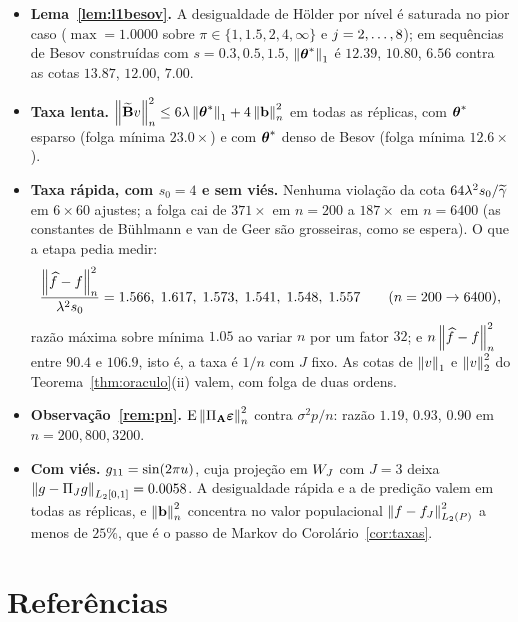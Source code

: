 \documentclass[11pt,a4paper]{article}
\newcommand{\Amat}{\mathbf{A}}
\newcommand{\Bmat}{\mathbf{B}}
\newcommand{\Btil}{\widetilde{\Bmat}}
\newcommand{\PA}{\Pi_{\Amat}}
\newcommand{\bveps}{\boldsymbol{\varepsilon}}
\newcommand{\bb}{\mathbf{b}}
\newcommand{\gtil}{\widetilde{\gamma}}
\begin{document}
\begin{itemize}[nosep, leftmargin=*]
    $0.95$: a cota sub-gaussiana é conservadora por um fator $2$
    ($\pen_{0}$ mediano $0.1437$ contra
    $\lVert\Btil\T\bveps/n\rVert_{\infty}$ mediano $0.0717$ em $n = 200$).
  \item \textbf{Lema~\ref{lem:l1besov}.} A desigualdade de Hölder por nível é
    saturada no pior caso ($\max = 1.0000$ sobre
    $\pi \in \{1, 1.5, 2, 4, \infty\}$ e $j = 2,\dots,8$); em sequências de
    Besov construídas com $s = 0.3, 0.5, 1.5$, $\left\lVert \boldsymbol{\theta}^{*} \right\rVert_{1}$ é
    $12.39$, $10.80$, $6.56$ contra as cotas $13.87$, $12.00$, $7.00$.
  \item \textbf{Taxa lenta.} $\normn{\Btil v}^{2} \le 6\pen\norm{\thetastar}_{1}
    + 4\normn{\bb}^{2}$ em todas as réplicas, com $\boldsymbol{\theta}^{*}$ esparso
    (folga mínima $23.0\times$) e com $\boldsymbol{\theta}^{*}$ denso de Besov
    (folga mínima $12.6\times$).
  \item \textbf{Taxa rápida, com $s_{0} = 4$ e sem viés.} Nenhuma violação da
    cota $64\pen^{2}s_{0}/\gtil$ em $6 \times 60$ ajustes; a folga cai de
    $371\times$ em $n = 200$ a $187\times$ em $n = 6400$ (as constantes de
    Bühlmann e van de Geer são grosseiras, como se espera). O que a etapa
    pedia medir:
    \[
      \frac{\left\lVert \widehat{f}-f \right\rVert_{n}^{2}}{\lambda^{2}s_{0}}
      = 1.566,\; 1.617,\; 1.573,\; 1.541,\; 1.548,\; 1.557
      \qquad (n = 200 \to 6400),
    \]
    razão máxima sobre mínima $1.05$ ao variar $n$ por um fator $32$; e
    $n\left\lVert \widehat{f}-f \right\rVert_{n}^{2}$ entre $90.4$ e $106.9$, isto é, a taxa é
    $1/n$ com $J$ fixo. As cotas de $\left\lVert v \right\rVert_{1}$ e $\left\lVert v \right\rVert_{2}^{2}$ do
    Teorema~\ref{thm:oraculo}(ii) valem, com folga de duas ordens.
  \item \textbf{Observação~\ref{rem:pn}.} $\E\normn{\PA\bveps}^{2}$ contra
    $\sigma^{2}p/n$: razão $1.19$, $0.93$, $0.90$ em $n = 200, 800, 3200$.
  \item \textbf{Com viés.} $g_{11} = \sin(2\pi u)$, cuja projeção em
    $W_{J}$ com $J = 3$ deixa $\left\lVert g - \Pi_{J} g \right\rVert_{L_{2}[0,1]} = 0.0058$. A
    desigualdade rápida e a de predição valem em todas as réplicas, e
    $\normn{\bb}^{2}$ concentra no valor populacional
    $\left\lVert f-f_{J} \right\rVert_{L_{2}(P)}^{2}$ a menos de $25\%$, que é o passo de Markov
    do Corolário~\ref{cor:taxas}.
\end{itemize}

\section*{Referências}
\sloppy
\end{document}
